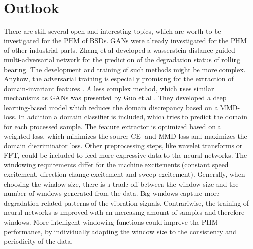 \chapter{Outlook}
There are still several open and interesting topics, which are worth to be investigated for the PHM of BSDs. GANs were already investigated for the PHM of other industrial parts. Zhang et al \cite{Zhang2019} developed a wasserstein distance guided multi-adversarial network for the prediction of the degradation status of rolling bearing. The development and training of such methods might be more complex. Anyhow, the adversarial training is especially promising for the extraction of domain-invariant features \cite{Zhang2019}. A less complex method, which uses similar mechanisms as GANs was presented by Guo et al \cite{Guo2019}. They developed a deep learning-based model which reduces the domain discrepancy based on a MMD-loss. In addition a domain classifier is included, which tries to predict the domain for each processed sample. The feature extractor is optimized based on a weighted loss, which minimizes the source CE- and MMD-loss and maximizes the domain discriminator loss. Other preprocessing steps, like wavelet transforms or FFT, could be included to feed more expressive data to the neural networks. The windowing requirements differ for the machine excitements (constant speed excitement, direction change excitement and sweep excitement). Generally, when choosing the window size, there is a trade-off between the window size and the number of windows generated from the data. Big windows capture more degradation related patterns of the vibration signals. Contrariwise, the training of neural networks is improved with an increasing amount of samples and therefore windows.  More intelligent windowing functions could improve the PHM performance, by individually adapting the window size to the consistency and periodicity of the data.
\begin{comment}
Also the preprocessing of the recorded machine signals could be improved. In this thesis a simple windowing function was used to separate the data in shorter sequences. Generally, the generated windows should capture the degradation related patterns of the vibration signals. For this reason, the windows should be adjusted to the consistency and periodicity of the data. The windowing requirements differ for the machine excitements (constant speed excitement, direction change excitement and sweep excitement). Generally, when choosing the window size, there is a trade-off between the window size and the number of windows generated from the data. Both extremes (few big windows and numerous small windows) might lead to problems during the training. The PHM results might be improved by applying an adaptive preprocessing to generate data windows of suitable length, which are well synchronized with the data. Lastly, also the potential performance gains due to the combination of several signals could be investigated in more detail.
\end{comment}